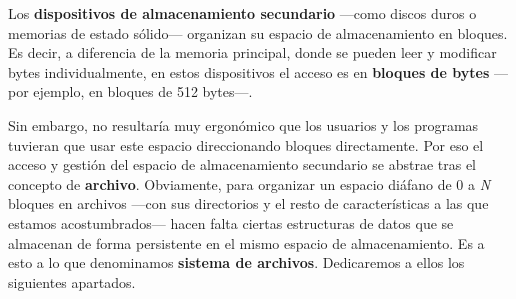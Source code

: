 Los \textbf{dispositivos de almacenamiento secundario} ---como discos
duros o memorias de estado sólido--- organizan su espacio de
almacenamiento en bloques. Es decir, a diferencia de la memoria
principal, donde se pueden leer y modificar bytes individualmente, en
estos dispositivos el acceso es en \textbf{bloques de bytes} ---por
ejemplo, en bloques de 512 bytes---.

Sin embargo, no resultaría muy ergonómico que los usuarios y los
programas tuvieran que usar este espacio direccionando bloques
directamente. Por eso el acceso y gestión del espacio de almacenamiento
secundario se abstrae tras el concepto de \textbf{archivo}. Obviamente,
para organizar un espacio diáfano de 0 a \emph{N} bloques en archivos
---con sus directorios y el resto de características a las que estamos
acostumbrados--- hacen falta ciertas estructuras de datos que se
almacenan de forma persistente en el mismo espacio de almacenamiento. Es
a esto a lo que denominamos \textbf{sistema de archivos}. Dedicaremos a
ellos los siguientes apartados.
